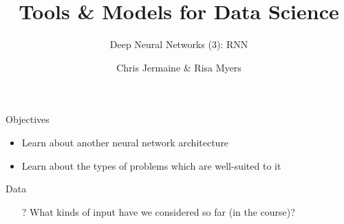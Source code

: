 \documentclass[aspectratio=169]{beamer}
\title[]
{Tools \& Models for Data Science}
\subtitle{Deep Neural Networks (3): RNN}
\author[]{Chris Jermaine \& Risa Myers}
\institute
{
  Rice University 
}
\date[]{}
\begin{document}
\begin{frame}
 \titlepage
\end{frame}
\begin{frame}{Objectives}

\begin{itemize}
\item Learn about another neural network architecture
\item Learn about the types of problems which are well-suited to it
\end{itemize}
\end{frame}
\begin{frame}{Data}

\begin{itemize}
	\item[?] What kinds of input have we considered so far (in the course)?
\end{itemize}
\end{frame}
%
\end{document}
